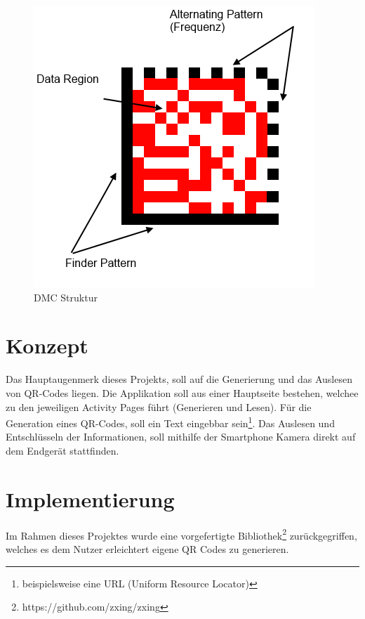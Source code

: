 \documentclass[12pt,					%
							 oneside,			%
							 a4paper,			%
							 halfparskip,		%
							 liststotoc,			%
							 bibtotoc,			%
							 fleqn,				%
							 pointlessnumbers]	%
							 {scrreprt}
\begin{document}
\begin{figure}[ht]
\centering   
	 \includegraphics[scale=0.5]{pictures/dmc} 
 	\caption{DMC Struktur \cite{dmcexample}}
\end{figure}
\chapter{Konzept}
Das Hauptaugenmerk dieses Projekts, soll auf die Generierung und das Auslesen von QR-Codes liegen. Die Applikation soll aus einer Hauptseite bestehen, welchee zu den jeweiligen Activity Pages führt (Generieren und Lesen). Für die Generation eines QR-Codes, soll ein Text eingebbar sein\footnote{beispielsweise eine URL (Uniform Resource Locator)}. Das Auslesen und Entschlüsseln der Informationen, soll mithilfe der Smartphone Kamera direkt auf dem Endgerät stattfinden.

\chapter{Implementierung}	
Im Rahmen dieses Projektes wurde eine vorgefertigte Bibliothek\footnote{https://github.com/zxing/zxing} zurückgegriffen, welches es dem Nutzer erleichtert eigene QR Codes zu generieren.
\end{document}
